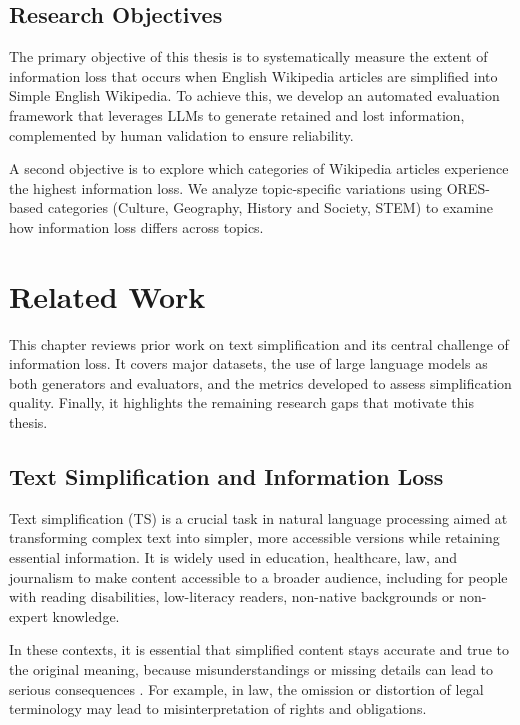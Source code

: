 \documentclass{DESSThesis}
\begin{document}
\section{Research Objectives}
The primary objective of this thesis is to systematically measure the extent of information loss that occurs when English Wikipedia articles are simplified into Simple English Wikipedia. To achieve this, we develop an automated evaluation framework that leverages LLMs to generate retained and lost information, complemented by human validation to ensure reliability.

A second objective is to explore which categories of Wikipedia articles experience the highest information loss. We analyze topic-specific variations using ORES-based categories (Culture, Geography, History and Society, STEM) to examine how information loss differs across topics.

\chapter{Related Work}
\label{sec:Related Work}
This chapter reviews prior work on text simplification and its central challenge of information loss. It covers major datasets, the use of large language models as both generators and evaluators, and the metrics developed to assess simplification quality. Finally, it highlights the remaining research gaps that motivate this thesis.

\section{Text Simplification and Information Loss}
Text simplification (TS) is a crucial task in natural language processing aimed at transforming complex text into simpler, more accessible versions while retaining essential information\cite{saggion2011text, 10.1145/3442695}. It is widely used in education\cite{rebello2019effects, javourey2022simplification}, healthcare\cite{kandula2010semantic}, law\cite{cemri2022unsupervisedsimplificationlegaltexts, garimella-etal-2022-text}, and journalism\cite{fatima-strube-2023-cross} to make content accessible to a broader audience, including for people with reading disabilities\cite{carroll1998practical, inui2003text}, low-literacy readers\cite{10.1145/1621995.1622002, de2010text}, non-native backgrounds\cite{petersen2007text, allen2009study} or non-expert knowledge\cite{fatima-strube-2023-cross, hofmann2025thmsimpletext2025task}. 

In these contexts, it is essential that simplified content stays accurate and true to the original meaning\cite{martínez2024exploringlargelanguagemodels}, because misunderstandings or missing details can lead to serious consequences \cite{trienes2024infolossqacharacterizingrecoveringinformation}. For example, in law, the omission or distortion of legal terminology may lead to misinterpretation of rights and obligations\cite{garimella-etal-2022-text}.
\end{document}
